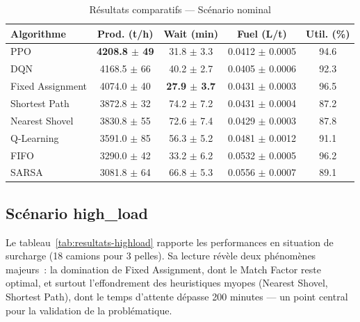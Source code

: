 \documentclass[11pt,a4paper]{report}
\begin{document}
\begin{table}[H]
\centering
\caption{Résultats comparatifs — Scénario nominal}
\label{tab:resultats-nominal}
\begin{tabular}{lcccc}
\toprule
\textbf{Algorithme} & \textbf{Prod. (t/h)} & \textbf{Wait (min)} & \textbf{Fuel (L/t)} & \textbf{Util. (\%)} \\
\midrule
PPO              & \textbf{4208.8 $\pm$ 49} & 31.8 $\pm$ 3.3
    & 0.0412 $\pm$ 0.0005 & 94.6 \\
DQN              & 4168.5 $\pm$ 66 & 40.2 $\pm$ 2.7
    & 0.0405 $\pm$ 0.0006 & 92.3 \\
Fixed Assignment & 4074.0 $\pm$ 40 & \textbf{27.9 $\pm$ 3.7}
    & 0.0431 $\pm$ 0.0003 & 96.5 \\
Shortest Path    & 3872.8 $\pm$ 32 & 74.2 $\pm$ 7.2
    & 0.0431 $\pm$ 0.0004 & 87.2 \\
Nearest Shovel   & 3830.8 $\pm$ 55 & 72.6 $\pm$ 7.4
    & 0.0429 $\pm$ 0.0003 & 87.8 \\
Q-Learning       & 3591.0 $\pm$ 85 & 56.3 $\pm$ 5.2
    & 0.0481 $\pm$ 0.0012 & 91.1 \\
FIFO             & 3290.0 $\pm$ 42 & 33.2 $\pm$ 6.2
    & 0.0532 $\pm$ 0.0005 & 96.2 \\
SARSA            & 3081.8 $\pm$ 64 & 66.8 $\pm$ 5.3
    & 0.0556 $\pm$ 0.0007 & 89.1 \\
\bottomrule
\end{tabular}
\end{table}

\subsection{Scénario high\_load}

Le tableau~\ref{tab:resultats-highload} rapporte les performances en situation de surcharge (18 camions pour 3 pelles). Sa lecture r\'ev\`ele deux ph\'enom\`enes majeurs~: la domination de Fixed Assignment, dont le Match Factor reste optimal, et surtout l'effondrement des heuristiques myopes (Nearest Shovel, Shortest Path), dont le temps d'attente d\'epasse 200 minutes --- un point central pour la validation de la probl\'ematique.
\end{document}
